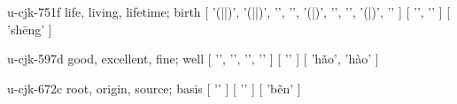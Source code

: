\begin{multicols}{2}
\cjkgGlue{} u-cjk-751f  life, living, lifetime; birth  [ '\cjkgGlue{}(\cjkgGlue{}|\cjkgGlue{}|\cjkgGlue{})',
  '\cjkgGlue{}(\cjkgGlue{}|\cjkgGlue{}|\cjkgGlue{})',
  '\cjkgGlue{}',
  '\cjkgGlue{}',
  '\cjkgGlue{}(\cjkgGlue{}|\cjkgGlue{})',
  '\cjkgGlue{}',
  '\cjkgGlue{}',
  '\cjkgGlue{}(\cjkgGlue{}|\cjkgGlue{})',
  '\cjkgGlue{}' ]  [ '\cjkgGlue{}', '\cjkgGlue{}' ]  [ 'sh{\mktsRsgFb{}ē}ng' ] 

\cjkgGlue{} u-cjk-597d  good, excellent, fine; well  [ '\cjkgGlue{}', '\cjkgGlue{}', '\cjkgGlue{}', '\cjkgGlue{}' ]  [ '\cjkgGlue{}' ]  [ 'h{\mktsRsgFb{}ǎ}o', 'hào' ] 

\cjkgGlue{} u-cjk-672c  root, origin, source; basis  [ '\cjkgGlue{}' ]  [ '\cjkgGlue{}' ]  [ 'b{\mktsRsgFb{}ě}n' ] 


\end{multicols}
